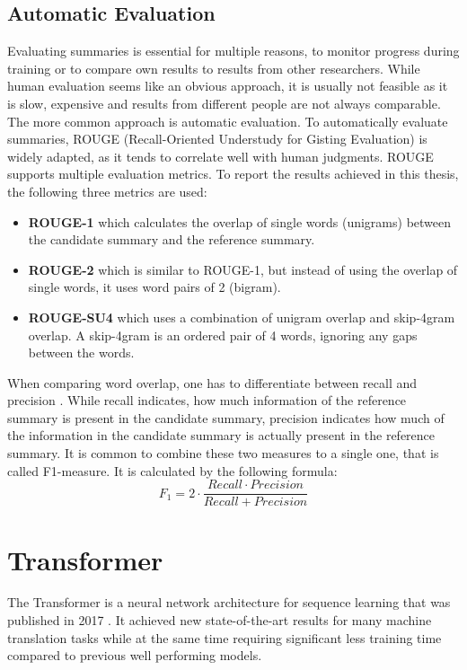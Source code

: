 \subsection{Automatic Evaluation}

Evaluating summaries is essential for multiple reasons, \eg to monitor progress during training or to compare own results to results from other researchers.
While human evaluation seems like an obvious approach, it is usually not feasible as it is slow, expensive and results from different people are not always comparable.
The more common approach is automatic evaluation.
To automatically evaluate summaries, ROUGE (Recall-Oriented Understudy for Gisting Evaluation) \cite{lin-2004-rouge} is widely adapted, as it tends to correlate well with human judgments.
ROUGE supports multiple evaluation metrics.
To report the results achieved in this thesis, the following three metrics are used:
\begin{itemize}
\item \textbf{ROUGE-1} which calculates the overlap of single words (unigrams) between the candidate summary and the reference summary. 
\item \textbf{ROUGE-2} which is similar to ROUGE-1, but instead of using the overlap of single words, it uses word pairs of 2 (bigram).
\item \textbf{ROUGE-SU4} which uses a combination of unigram overlap and skip-4gram overlap.
A skip-4gram is an ordered pair of 4 words, ignoring any gaps between the words.
\end{itemize}

When comparing word overlap, one has to differentiate between recall and precision \cite{Ting2010}.
While recall indicates, how much information of the reference summary is present in the candidate summary, precision indicates how much of the information in the candidate summary is actually present in the reference summary.
It is common to combine these two measures to a single one, that is called F1-measure.
It is calculated by the following formula:
\[
	F_1 = 2 \cdot \frac{Recall \cdot Precision}{Recall + Precision}
\]


\section{Transformer}\label{sec:transformer}

The Transformer is a neural network architecture for sequence learning that was published in 2017 \cite{1706.03762}.
It achieved new state-of-the-art results for many machine translation tasks while at the same time requiring significant less training time compared to previous well performing models.

